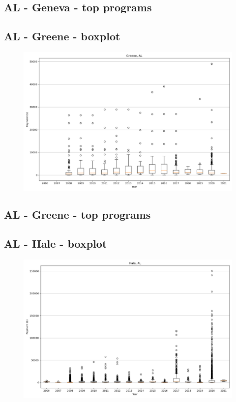 \subsection*{AL - Geneva - top programs}

\newpage
\subsection*{AL - Greene - boxplot}
\begin{figure}[h]
\centering
\includegraphics[width=7in]{../output/boxplots/counties/Greene-AL_boxplot.png}
\end{figure}


\subsection*{AL - Greene - top programs}

\newpage
\subsection*{AL - Hale - boxplot}
\begin{figure}[h]
\centering
\includegraphics[width=7in]{../output/boxplots/counties/Hale-AL_boxplot.png}
\end{figure}


